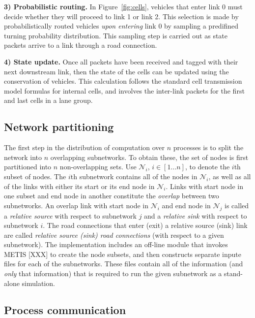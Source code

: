 \vspace{1em}\noindent \textbf{3) Probabilistic routing.} 
In Figure~\ref{fig:cells}, vehicles that enter link 0 must decide whether they will proceed to link 1 or link 2. This selection is made by probabilistically routed vehicles \textit{upon entering} link 0 by sampling a predifined turning probability distribution. This sampling step is carried out as state packets arrive to a link through a road connection. 

\vspace{1em} \noindent \textbf{4) State update.} Once all packets have been received and tagged with their next downstream link, then the state of the cells can be updated using the conservation of vehicles. This calculation follows the standard cell transmission model formulas for internal cells, and involves the inter-link packets for the first and last cells in a lane group. 

\subsection{Network partitioning}

The first step in the distribution of computation over $n$ processes is to split the network into $n$ overlapping subnetworks. To obtain these, the set of nodes is first partitioned into $n$ non-overlapping sets. Use $\mathcal{N}_i$, $i\in[1\hdots n]$, to denote the $i$th subset of nodes. The $i$th subnetwork contains all of the nodes in $\mathcal{N}_i$, as well as all of the links with either its start or its end node in $\mathcal{N}_i$. 
Links with start node in one subset and end node in another constitute the \textit{overlap} between two subnetworks. An overlap link with start node in $\mathcal{N}_i$ and end node in $\mathcal{N}_j$ is called a \textit{relative source} with respect to subnetwork $j$ and a \textit{relative sink} with respect to subnetwork $i$. The road connections that enter (exit) a relative source (sink) link are called \textit{relative source (sink) road connections} (with respect to a given subnetwork). The implementation includes an off-line module that invokes METIS [XXX] to create the node subsets, and then constructs separate inpute files for each of the subnetworks. These files contain all of the information (and \textit{only} that information) that is required to run the given subnetwork as a stand-alone simulation. 

\subsection{Process communication}

